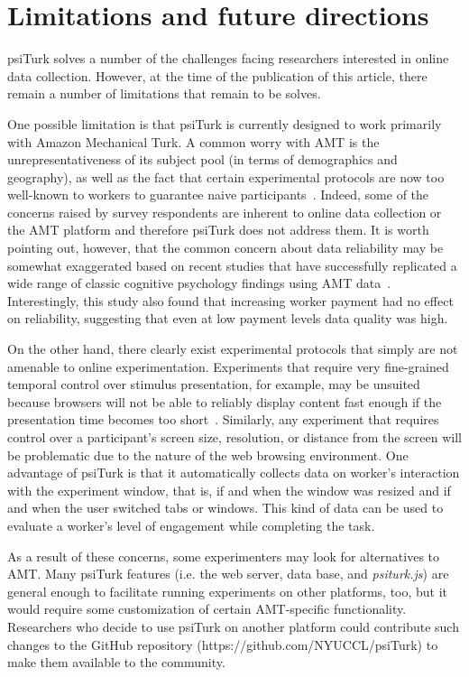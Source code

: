 \documentclass[twocolumn]{svjour3}          %
\newcommand{\psiturk}[0]{\textsf{psiTurk}}
\newcommand{\psiturkjs}[0]{\emph{psiturk.js}}
\begin{document}
\section{Limitations and future directions}

\psiturk{} solves a number of the challenges facing researchers interested in online data collection.
However, at the time of the publication of this article, there remain a number of limitations 
that remain to be solves.

One possible limitation is that \psiturk{} is currently designed to work primarily with Amazon Mechanical Turk. 
A common worry with AMT is the unrepresentativeness of its subject pool (in terms of demographics and 
geography), as well as the fact that certain experimental protocols are now too well-known to workers to guarantee naive
participants~\citep{chandler2014nonnaivete}.  Indeed, some of the concerns raised by survey respondents are inherent 
to online data collection or the AMT platform and therefore \psiturk{} does not address them.
It is worth pointing out, however, that the common concern about data reliability may be somewhat exaggerated 
based on recent studies that have successfully replicated a wide range of classic cognitive psychology findings using 
AMT data~\citep{crump2013evaluating}. Interestingly, this study also found that increasing worker payment had no effect on 
reliability, suggesting that even  at low payment levels data quality was high. 

On the other hand, there clearly exist experimental protocols that simply are not amenable to online
experimentation. Experiments that require very fine-grained temporal control over stimulus presentation, for example, 
may be unsuited because browsers will not be able to reliably display content fast enough if the presentation time
becomes too short~\citep{crump2013evaluating}.
Similarly, any experiment that requires control over a participant's screen size, resolution, or distance from the screen will 
be problematic due to the nature of the web browsing environment.
One advantage of \psiturk{} is that it automatically collects data on worker's interaction with the experiment window, that is, 
if and when the window was resized and if and when the user switched tabs or windows. 
This kind of data can be used to evaluate a worker's level of engagement while completing the task.

As a result of these concerns, some experimenters may look for alternatives to AMT. 
Many \psiturk{} features (i.e. the web server, data base, and \psiturkjs{}) are general enough to facilitate running experiments 
on other platforms, too, but it would require some customization of certain AMT-specific functionality. 
Researchers who decide to use \psiturk{} on another platform could contribute such changes to the GitHub repository 
(\textsf{https://github.com/NYUCCL/psiTurk}) to make them available to the community.
\end{document}
